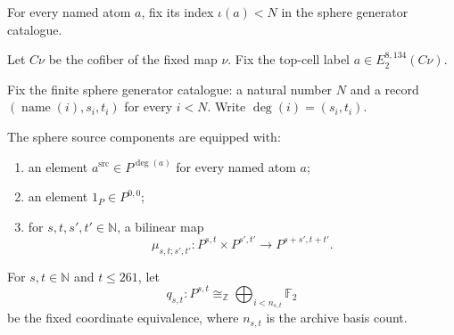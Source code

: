 \begin{definition}
\label{frontier:E2Computation:5ff813cd73ee}
For every named atom $a$, fix its index $\iota(a)<N$ in the sphere generator catalogue.
\end{definition}

\begin{definition}
\label{frontier:E2Computation:6ac06ebae49b}
Let $C\nu$ be the cofiber of the fixed map $\nu$. Fix the top-cell label $a\in E_2^{8,134}(C\nu)$.
\end{definition}

\begin{definition}
\label{frontier:E2Computation:7008d6a19504}
Fix the finite sphere generator catalogue: a natural number $N$ and a record $(\operatorname{name}(i),s_i,t_i)$ for every $i<N$. Write $\deg(i)=(s_i,t_i)$.
\end{definition}

\begin{definition}
\label{frontier:E2Computation:843c331404a2}
The sphere source components are equipped with:
\begin{enumerate}
\item an element $a^{\mathrm{src}}\in P^{\deg(a)}$ for every named atom $a$;
\item an element $1_P\in P^{0,0}$;
\item for $s,t,s',t'\in\mathbb N$, a bilinear map
\[\mu_{s,t;s',t'}:P^{s,t}\times P^{s',t'}\longrightarrow P^{s+s',t+t'}.\]
\end{enumerate}
\end{definition}

\begin{definition}
\label{frontier:E2Computation:8f09e4b56647}
For $s,t\in\mathbb N$ and $t\leq261$, let
\[q_{s,t}:P^{s,t}\cong_{\mathbb Z}\bigoplus_{i<n_{s,t}}\mathbb F_2\]
be the fixed coordinate equivalence, where $n_{s,t}$ is the archive basis count.
\end{definition}

